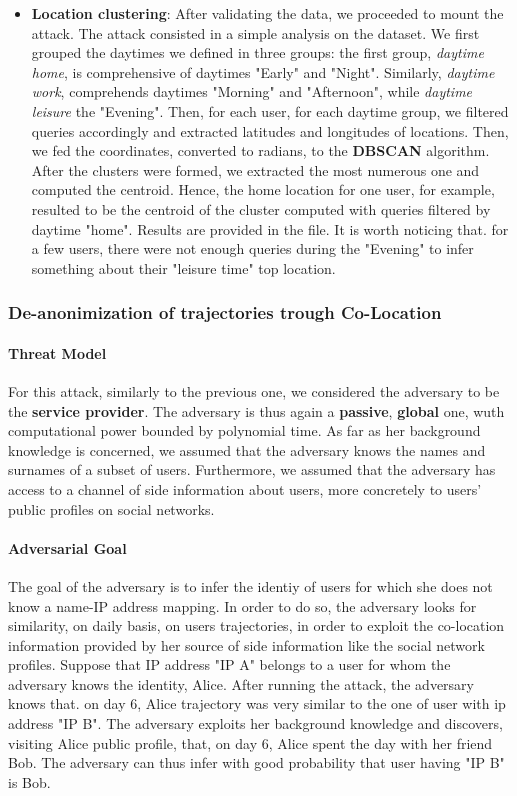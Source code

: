 \documentclass[10pt,conference,compsocconf]{IEEEtran}
\begin{document}
\begin{itemize}
    \item \textbf{Location clustering}: After validating the data, we proceeded to mount the attack. The attack consisted in a simple analysis on the dataset. We first grouped the daytimes we defined in three groups: the first group, \textit{daytime home}, is comprehensive of daytimes "Early" and "Night". Similarly, \textit{daytime work}, comprehends daytimes "Morning" and "Afternoon", while \textit{daytime leisure} the "Evening". Then, for each user, for each daytime group, we filtered queries accordingly and extracted latitudes and longitudes of locations. Then, we fed the coordinates, converted to radians, to the \textbf{DBSCAN} algorithm. After the clusters were formed, we extracted the most numerous one and computed the centroid. Hence, the home location for one user, for example, resulted to be the centroid of the cluster computed with queries filtered by daytime "home". Results are provided in the  file. It is worth noticing that. for a few users, there were not enough queries during the "Evening" to infer something about their "leisure time" top location.
\end{itemize}

\subsubsection{De-anonimization of trajectories trough Co-Location}


\paragraph{Threat Model}
For this attack, similarly to the previous one, we considered the adversary to be the \textbf{service provider}. The adversary is thus again a \textbf{passive}, \textbf{global} one, wuth computational power bounded by polynomial time.\newline
As far as her background knowledge is concerned, we assumed that the adversary knows the names and surnames of a subset of users. Furthermore, we assumed that the adversary has access to a channel of side information about users, more concretely to users' public profiles on social networks.


\paragraph{Adversarial Goal}
The goal of the adversary is to infer the identiy of users for which she does not know a name-IP address mapping. In order to do so, the adversary looks for similarity, on daily basis, on users trajectories, in order to exploit the co-location information provided by her source of side information like the social network profiles. Suppose that IP address "IP A" belongs to a user for whom the adversary knows the identity, Alice. After running the attack, the adversary knows
that. on day 6, Alice trajectory was very similar to the one of user with ip address "IP B". The adversary exploits her background knowledge and discovers, visiting Alice public profile, that, on day 6, Alice spent the day with her friend Bob. The adversary can thus infer with good probability that user having "IP B" is Bob.
\end{document}
